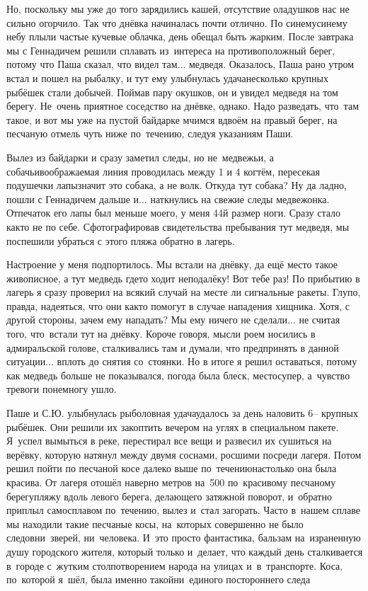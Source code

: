 Но, поскольку мы уже до того зарядились кашей, отсутствие оладушков нас не сильно огорчило. Так что днёвка начиналась почти отлично. По синему\sdash синему небу плыли частые кучевые облачка, день обещал быть жарким. После завтрака мы с Геннадичем решили сплавать из~интереса на противоположный берег, потому что Паша сказал, что видел там$\ldots$ медведя. Оказалось, Паша рано утром встал и пошел на рыбалку, и тут ему улыбнулась удача\mdash несколько крупных рыбёшек стали добычей. Поймав пару окушков, он и увидел медведя на том берегу. Не~очень приятное соседство на днёвке, однако. Надо разведать, что~там такое, и вот мы уже на пустой байдарке мчимся вдвоём на правый берег, на песчаную отмель чуть ниже по~течению, следуя указаниям Паши.

\newpage
Вылез из байдарки и сразу заметил следы, но не~медвежьи, а собачьи\mdash воображаемая линия проводилась между 1 и 4 когтём, пересекая подушечки лапы\mdash значит это собака, а не волк. Откуда тут собака? Ну да ладно, пошли с Геннадичем дальше и$\ldots$ наткнулись на свежие следы медвежонка. Отпечаток его лапы был меньше моего, у меня 44\sdash й размер ноги. Сразу стало как\sdash то не по себе. Сфотографировав свидетельства пребывания тут медведя, мы поспешили убраться с этого пляжа обратно в лагерь. 

Настроение у меня подпортилось. Мы встали на днёвку, да ещё место такое живописное, а тут медведь где\sdash то ходит неподалёку! Вот тебе раз! По прибытию в лагерь я сразу проверил на всякий случай на месте ли сигнальные ракеты. Глупо, правда, надеяться, что они как\sdash то помогут в случае нападения хищника. Хотя, с другой стороны, зачем ему нападать? Мы ему ничего не сделали$\ldots$ не считая того, что~встали тут на днёвку. Короче говоря, мысли роем носились в адмиральской голове, сталкивались там и думали, что предпринять в данной ситуации$\ldots$ вплоть до снятия со~стоянки. Но в итоге я решил оставаться, потому как медведь больше не показывался, погода была блеск, место\mdash супер, а~чувство тревоги понемногу ушло. 

Паше и С.Ю. улыбнулась рыболовная удача\mdash удалось за день наловить 6\thinspace\nobreakdash-- крупных рыбёшек. Они решили их закоптить вечером на углях в специальном пакете. Я~успел вымыться в реке, перестирал все вещи и развесил их сушиться на верёвку, которую натянул между двумя соснами, росшими посреди лагеря. Потом решил пойти по песчаной косе далеко выше по~течению\mdash настолько она была красива. От лагеря отошёл наверно метров на~500 по~красивому песчаному берегу\sdash пляжу вдоль левого берега, делающего затяжной поворот, и~обратно приплыл самосплавом по~течению, вылез и~стал загорать. Часто в~нашем сплаве мы находили такие песчаные косы, на~которых совершенно не было следов\mdash ни~зверей, ни~человека. И~это просто фантастика, бальзам на~израненную душу городского жителя, который только и~делает, что каждый день сталкивается в~городе с~жутким столпотворением народа на улицах и~в~транспорте. Коса, по~которой я~шёл, была именно такой\mdash ни~единого постороннего следа\mdash


